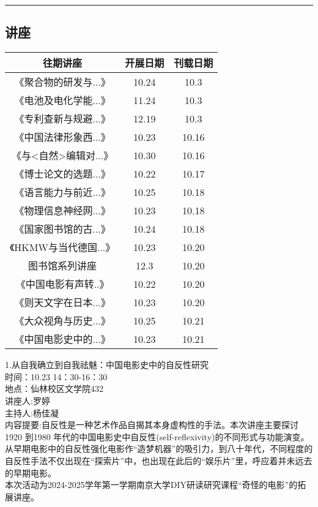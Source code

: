 \documentclass[letterpaper, 12pt]{article}
\begin{document}
\hrule
\pagebreak
\begin{multicols}{2}

\section{讲座}
\begin{tabular}{|c|c|c|}
    \hline
    往期讲座 & 开展日期 & 刊载日期\\
    \hline\hline
    《聚合物的研发与...》 & 10.24 & 10.3\\
    《电池及电化学能...》 & 11.24 & 10.3\\
    《专利查新与规避...》 & 12.19 & 10.3\\
    《中国法律形象西...》 & 10.23 & 10.16\\
    《与<自然>编辑对...》 & 10.30 & 10.16\\
    《博士论文的选题...》 & 10.22 & 10.17\\
    《语言能力与前近...》 & 10.25 & 10.18\\
    《物理信息神经网...》 & 10.23 & 10.18\\
    《国家图书馆的古...》 & 10.24 & 10.18\\
    《HKMW与当代德国...》 & 10.23 & 10.20\\
    图书馆系列讲座 & 12.3 & 10.20\\
    《中国电影有声转..》 & 10.22 & 10.20\\
    《则天文字在日本...》 & 10.23 & 10.20\\
    《大众视角与历史...》 & 10.25 & 10.21\\
    《中国电影史中的...》 & 10.23 & 10.21\\
    \hline
\end{tabular}



1.从自我确立到自我祛魅：中国电影史中的自反性研究\\
时间：10.23 14：30-16：30\\
地点：仙林校区文学院432\\
讲座人:罗婷\\
主持人:杨佳凝\\
内容提要:自反性是一种艺术作品自揭其本身虚构性的手法。本次讲座主要探讨1920 到1980 年代的中国电影史中自反性(self-reflexivity)的不同形式与功能演变。从早期电影中的自反性强化电影作“造梦机器”的吸引力，到八十年代，不同程度的自反性手法不仅出现在“探索片”中，也出现在此后的“娱乐片”里，呼应着并未远去的早期电影。\\
本次活动为2024-2025学年第一学期南京大学DIY研读研究课程“奇怪的电影”的拓展讲座。\\


\end{multicols}
\end{document}
